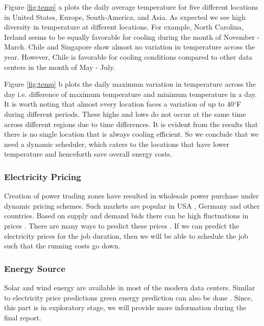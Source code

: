 \documentclass[letterpaper,twocolumn,12pt]{article}
\begin{document}
Figure \ref{fig:temp} a plots the daily average temperature for five different locations in United States, Europe, South-America, and Asia. As expected we see high diversity in temperature at different locations. For example, North Carolina, Ireland seems to be equally favorable for cooling during the month of November {-} March. Chile and Singapore show almost no variation in temperature across the year. However, Chile is favorable for cooling conditions compared to other data centers in the month of May {-} July. 

Figure \ref{fig:temp} b plots the daily maximum variation in temperature across the day i.e. difference of maximum temperature and minimum temperature in a day.  It is worth noting that almost every location faces a variation of up to 40$^{\circ}$F during different periods. These highs and lows do not occur at the same time across different regions due to time differences. It is evident from the results that there is no single location that is always cooling efficient. So we conclude that we need a dynamic scheduler, which caters to the locations that have lower temperature and henceforth save overall energy costs.

\subsubsection{Electricity Pricing} \label{sec:elec}
Creation of power trading zones have resulted in wholesale power purchase under dynamic pricing schemes. Such markets are popular in USA \cite{elecusa}, Germany \cite{elecgermany} and other countries. Based on supply and demand bids there can be high fluctuations in prices \cite{benini2002day}. There are many ways to predict these prices \cite{contreras2003arima} \cite{garcia2005garch}. If we can predict the electricity prices for the job duration, then we will be able to schedule the job such that the running costs go down.

\subsubsection{Energy Source} \label{sec:green}
Solar and wind energy are available in most of the modern data centers. Similar to electricity price predictions green energy prediction can also be done \cite{goiri2012greenhadoop} \cite{aksanli2012utilizing}. Since, this part is in exploratory stage, we will provide more information during the final report.
\end{document}
